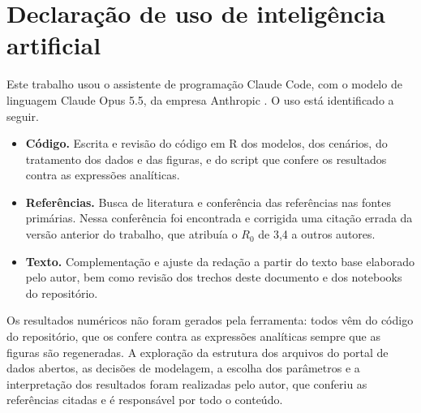 \section{Declaração de uso de inteligência artificial}
\label{sec:uso_ia}

Este trabalho usou o assistente de programação Claude Code, com o modelo de linguagem Claude Opus 5.5, da
empresa Anthropic \cite{anthropic2026}. O uso está identificado a seguir.

\begin{itemize}
  \item \textbf{Código.} Escrita e revisão do código em R dos modelos, dos cenários, do tratamento dos dados
  e das figuras, e do script que confere os resultados contra as expressões analíticas.
  \item \textbf{Referências.} Busca de literatura e conferência das referências nas fontes primárias. Nessa
  conferência foi encontrada e corrigida uma citação errada da versão anterior do trabalho, que atribuía o
  $R_0$ de 3,4 a outros autores.
  \item \textbf{Texto.} Complementação e ajuste da redação a partir do texto base elaborado pelo autor, bem
  como revisão dos trechos deste documento e dos notebooks do repositório.
\end{itemize}

Os resultados numéricos não foram gerados pela ferramenta: todos vêm do código do repositório, que os
confere contra as expressões analíticas sempre que as figuras são regeneradas. A exploração da estrutura
dos arquivos do portal de dados abertos, as decisões de modelagem, a escolha dos parâmetros e a
interpretação dos resultados foram realizadas pelo autor, que conferiu as referências citadas e é
responsável por todo o conteúdo.

